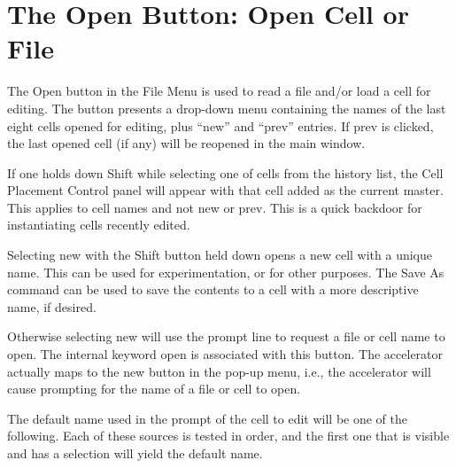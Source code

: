 \section{The {\cb Open} Button: Open Cell or File}
\label{editbut}

The {\cb Open} button in the {\cb File Menu} is used to read a file
and/or load a cell for editing.  The button presents a drop-down menu
containing the names of the last eight cells opened for editing, plus
``{\cb new}'' and ``{\cb prev}'' entries.  If {\cb prev} is clicked,
the last opened cell (if any) will be reopened in the main window.

If one holds down {\kb Shift} while selecting one of cells from the
history list, the {\cb Cell Placement Control} panel will appear with
that cell added as the current master.  This applies to cell names and
not {\cb new} or {\cb prev}.  This is a quick backdoor for
instantiating cells recently edited.

Selecting {\cb new} with the {\kb Shift} button held down opens a new
cell with a unique name.  This can be used for experimentation, or for
other purposes.  The {\cb Save As} command can be used to save the
contents to a cell with a more descriptive name, if desired.

Otherwise selecting {\cb new} will use the prompt line to request a
file or cell name to open.  The internal keyword {\vt open} is
associated with this button.  The accelerator actually maps to the
{\cb new} button in the pop-up menu, i.e., the accelerator will cause
prompting for the name of a file or cell to open.

The default name used in the prompt of the cell to edit will be one of
the following.  Each of these sources is tested in order, and the
first one that is visible and has a selection will yield the default
name.

